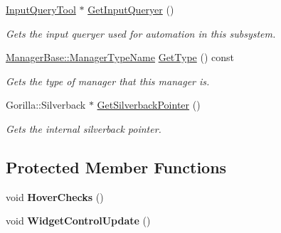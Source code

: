\begin{DoxyCompactItemize}
\hyperlink{classphys_1_1InputQueryTool}{InputQueryTool} $\ast$ \hyperlink{classphys_1_1UIManager_a7b88d0fe2271cdceccf879eaba1b1a64}{GetInputQueryer} ()
\begin{DoxyCompactList}\small\item\em Gets the input queryer used for automation in this subsystem. \item\end{DoxyCompactList}\item 
\hyperlink{classphys_1_1ManagerBase_aaa6ccddf23892eaccb898529414f80a5}{ManagerBase::ManagerTypeName} \hyperlink{classphys_1_1UIManager_ab8fe74564ca5dc09cbe4b1cc2c007e79}{GetType} () const 
\begin{DoxyCompactList}\small\item\em Gets the type of manager that this manager is. \item\end{DoxyCompactList}\item 
Gorilla::Silverback $\ast$ \hyperlink{classphys_1_1UIManager_a21623edd39c3e23de29f4cf3ed6e490a}{GetSilverbackPointer} ()
\begin{DoxyCompactList}\small\item\em Gets the internal silverback pointer. \item\end{DoxyCompactList}\end{DoxyCompactItemize}
\subsection*{Protected Member Functions}
\begin{DoxyCompactItemize}
\item 
\hypertarget{classphys_1_1UIManager_ae5beaafe73c68d39eb84463033941057}{
void {\bfseries HoverChecks} ()}
\label{d5/dc5/classphys_1_1UIManager_ae5beaafe73c68d39eb84463033941057}

\item 
\hypertarget{classphys_1_1UIManager_a33dc4ba5174693c6dbc14cb6ca9f9a2b}{
void {\bfseries WidgetControlUpdate} ()}
\label{d5/dc5/classphys_1_1UIManager_a33dc4ba5174693c6dbc14cb6ca9f9a2b}

\end{DoxyCompactItemize}
